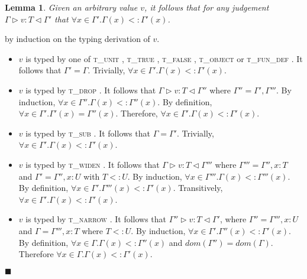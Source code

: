 \documentclass[preprint]{sigplanconf}
\newtheorem{lem}{Lemma}
\newcommand{\tunit}{\textsc{t\_unit} }
\newcommand{\ttrue}{\textsc{t\_true} }
\newcommand{\tfalse}{\textsc{t\_false} }
\newcommand{\tobj}{\textsc{t\_object} }
\newcommand{\tfundef}{\textsc{t\_fun\_def} }
\newcommand{\tdrop}{\textsc{t\_drop} }
\newcommand{\tsub}{\textsc{t\_sub} }
\newcommand{\tnarrow}{\textsc{t\_narrow} }
\newcommand{\twiden}{\textsc{t\_widen} }
\newcommand{\typerule}[4]{#1 \triangleright #2 : #3 \triangleleft #4}
\newcommand{\qed}{$\blacksquare$}
\newenvironment{proof}{\vspace{1ex}\noindent{\bf Proof}\hspace{0.5em}}
  {\hfill\qed\vspace{1ex}}
\begin{document}
\begin{lem}
\label{lem:valuectx}
Given an arbitrary value $v$, it follows that for any judgement
$\typerule{\Gamma}{v}{T}{\Gamma'}$ that 
$\forall x \in \Gamma' . \Gamma(x) <: \Gamma'(x)$.
\end{lem}
\begin{proof}
by induction on the typing derivation of $v$.

\begin{itemize}
\item $v$ is typed by one of \tunit, \ttrue, \tfalse,
\tobj or \tfundef. It follows that $\Gamma' = \Gamma$. Trivially,
$\forall x \in \Gamma' . \Gamma(x) <: \Gamma'(x)$.

\item $v$ is typed by \tdrop. It follows that $\typerule{\Gamma}{v}{T}{\Gamma''}$
where $\Gamma'' = \Gamma', \Gamma'''$. By induction,
$\forall x \in \Gamma'' . \Gamma(x) <: \Gamma''(x)$.
By definition, $\forall x \in \Gamma' . \Gamma'(x) = \Gamma''(x)$.
Therefore, $\forall x \in \Gamma' . \Gamma(x) <: \Gamma'(x)$.

\item $v$ is typed by \tsub. It follows that $\Gamma = \Gamma'$. Trivially,
$\forall x \in \Gamma' . \Gamma(x) <: \Gamma'(x)$.

\item $v$ is typed by \twiden. It follows that $\typerule{\Gamma}{v}{T}{\Gamma'''}$
where $\Gamma''' = \Gamma'', x : T$ and $\Gamma' = \Gamma'', x : U$ with
$T <: U$. By induction, $\forall x \in \Gamma''' . \Gamma(x) <: \Gamma'''(x)$.
By definition, $\forall x \in \Gamma' . \Gamma'''(x) <: \Gamma'(x)$. Transitively,
$\forall x \in \Gamma' . \Gamma(x) <: \Gamma'(x)$.

\item $v$ is typed by \tnarrow. It follows that $\typerule{\Gamma''}{v}{T}{\Gamma'}$,
where $\Gamma'' = \Gamma''', x : U$ and $\Gamma = \Gamma''', x : T$ where
$T <: U$. By induction, $\forall x \in \Gamma' . \Gamma''(x) <: \Gamma'(x)$.
By definition, $\forall x \in \Gamma . \Gamma(x) <: \Gamma''(x)$ and
$dom(\Gamma'') = dom(\Gamma)$. Therefore
$\forall x \in \Gamma . \Gamma(x) <: \Gamma'(x)$.

\end{itemize}
\end{proof}

\end{document}

